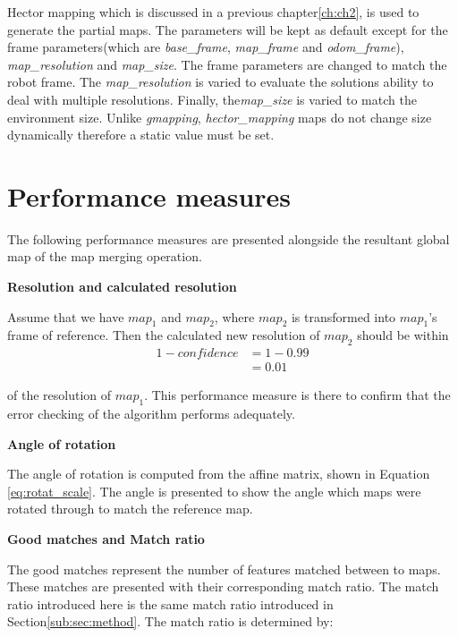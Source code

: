 Hector mapping which is discussed in a previous chapter\ref{ch:ch2}, is used to generate the partial maps. The parameters will be kept as default except for the frame parameters(which are \textit{base\_frame}, \textit{map\_frame} and \textit{odom\_frame}), \textit{map\_resolution}  and \textit{map\_size}. The frame parameters are changed to match the robot frame. The \textit{map\_resolution} is varied to evaluate the solutions ability to deal with multiple resolutions. Finally, the\textit{map\_size} is varied to match the environment size. Unlike \textit{gmapping}, \textit{hector\_mapping} maps do not change size dynamically therefore a static value must be set.

\section{Performance measures}

The following performance measures are presented alongside the resultant global map of the map merging operation. 

\textbf{Resolution and calculated resolution}

Assume that we have $map_1$ and $map_2$, where $map_2$
is transformed into $map_1$'s frame of reference. Then the calculated new resolution of $map_2$ should be within 
\begin{align*}
    1-confidence &= 1 - 0.99 \\
    & = 0.01  
\end{align*}

of the resolution of $map_1$. This performance measure is there to confirm that the error checking of the algorithm performs adequately.

\textbf{Angle of rotation}

The angle of rotation is computed from the affine matrix, shown in Equation \ref{eq:rotat_scale}. The angle is presented to show the angle which maps were rotated through to match the reference map.

\textbf{Good matches and Match ratio}

The good matches represent the number of features matched between to maps. These matches are presented with their corresponding match ratio. The match ratio introduced here is the same match ratio introduced in Section\ref{sub:sec:method}. The match ratio is determined by:

